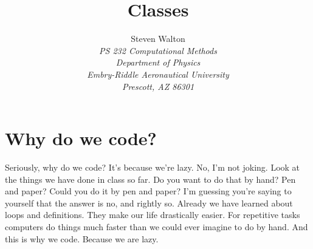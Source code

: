 \documentclass[11pt]{article}   %
\title{Classes}
\author{Steven Walton\\     %
\textit{PS 232 Computational Methods}\\
\textit{Department of Physics}\\
\textit{Embry-Riddle Aeronautical University}\\
\textit{Prescott, AZ   86301}}
\begin{document}
\maketitle
\section*{Why do we code?}
Seriously, why do we code?  It's because we're lazy.  No, I'm not joking.  Look at the things we have done in class so far.  Do you want to do that by hand?
Pen and paper?  Could you do it by pen and paper?  I'm guessing you're saying to yourself that the answer is no, and rightly so.  Already we have learned
about loops and definitions.  They make our life drastically easier.  For repetitive tasks computers do things much faster than we could ever imagine to do
by hand.  And this is why we code.  Because we are lazy.  
\\
\end{document}
